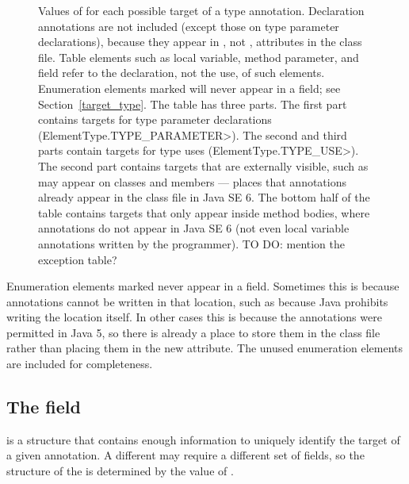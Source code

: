 \documentclass[10pt]{article}
\begin{document}
\begin{figure}[thp!]
\begin{center}
\begin{tabular}{|l|c|c|}
\hline
\end{tabular}
\end{center}
\vspace{-10pt}
\caption{\label{tbl:target_types}
  Values of  for each possible target of a type
  annotation.
  Declaration annotations are not included (except those on type parameter
  declarations), because they
  appear in , not \extendedannotation, attributes
  in the class file.
  Table elements such as local variable, method parameter, and field refer
  to the declaration, not the use, of such elements.
\newline
  Enumeration elements marked \unused{} will never appear in a
   field; see Section~\ref{target_type}.
\newline
  The table has three parts.
  The first part contains targets for type parameter declarations
  (\<ElementType.TYPE\_PARAMETER>).  The second and third parts contain
  targets for type uses (\<ElementType.TYPE\_USE>).
  The second part contains targets that are externally visible, such as may
  appear on classes and members --- places that annotations already appear
  in the class file in Java SE 6.
  The bottom half of the table contains targets that only appear inside
  method bodies, where annotations do not appear in Java SE 6 (not even
  local variable annotations written by the programmer).
TO DO: mention the exception table?
}
\end{figure}


Enumeration elements marked \unused{} never appear in a 
field.  Sometimes this is because annotations cannot be written in that
location, such as because Java prohibits writing the location itself.  In
other cases this is because the annotations were permitted in Java 5, so
there is already a place to store them in the class file
rather than placing them in the new \RuntimeInOrVisibleTypeAnnotations
attribute.  The unused enumeration elements are included for completeness.


\subsection{The  field\label{class-file:ext:target_info}}

 is a structure that contains enough information to
uniquely identify the target of a given annotation.  A different
 may require a different set of fields, so the structure
of the  is determined by the value of
.
\end{document}
